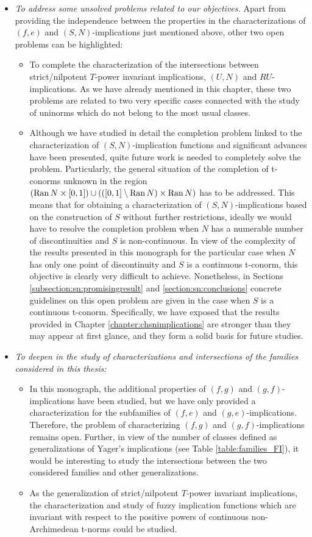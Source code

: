 \begin{itemize}
\item \textit{To address some unsolved problems related to our objectives.} Apart from providing the independence between the properties in the characterizations of $(f,e)$ and $(S,N)$-implications just mentioned above, other two open problems can be highlighted:
\begin{itemize}
	\item To complete the characterization of the intersections between strict/nilpotent $T$-power invariant implications, $(U,N)$ and $RU$-implications. As we have already mentioned in this chapter, these two problems are related to two very specific cases connected with the study of uninorms which do not belong to the most usual classes.
	\item Although we have studied in detail the completion problem linked to the characterization of $(S,N)$-implication functions and significant advances have been presented, quite future work is needed to completely solve the problem. Particularly, the general situation of the completion of t-conorms unknown in the region $(\operatorname{Ran} N \times [0,1]) \cup (([0,1] \setminus \operatorname{Ran} N) \times \operatorname{Ran} N)$ has to be addressed.  This means that for obtaining a characterization of $(S,N)$-implications based on the construction of $S$ without further restrictions, ideally we would have to resolve the completion problem when $N$ has a numerable number of discontinuities and $S$ is non-continuous. In view of the complexity of the results presented in this monograph for the particular case when $N$ has only one point of discontinuity and $S$ is a continuous t-conorm, this objective is clearly very difficult to achieve. Nonetheless, in Sections \ref{subsection:sn:promisingresult} and \ref{section:sn:conclusions} concrete guidelines on this open problem are given in the case when $S$ is a continuous t-conorm. Specifically, we have exposed that the results provided in Chapter \ref{chapter:chsnimplications} are stronger than they may appear at first glance, and they form a solid basis for future studies.
\end{itemize}

\item \textit{To deepen in the study of characterizations and intersections of the families considered in this thesis:}
\begin{itemize}
	\item In this monograph, the additional properties of $(f,g)$ and $(g,f)$-implications have been studied, but we have only provided a characterization for the subfamilies of $(f,e)$ and $(g,e)$-implications. Therefore, the problem of characterizing $(f,g)$ and $(g,f)$-implications remains open.  Further, in view of the number of classes defined as generalizations of Yager's implications (see Table \ref{table:families_FI}), it would be interesting to study the intersections between the two considered families and other generalizations.
	\item As the generalization of strict/nilpotent $T$-power invariant implications, the characterization and study of fuzzy implication functions which are invariant with respect to the positive powers of continuous non-Archimedean t-norms could be studied.
\end{itemize}


\end{itemize}
